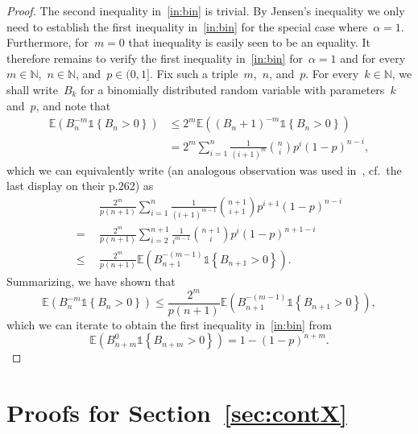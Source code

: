 \documentclass[11pt, a4paper]{article}
\newcommand{\N}{\mathbb{N}}
\theoremstyle{definition}
\begin{document}
\begin{proof}
The second inequality in~\eqref{in:bin} is trivial. By Jensen's inequality we only need to establish the first inequality in~\eqref{in:bin} for the special case where~$\alpha = 1$. Furthermore, for~$m = 0$ that inequality is easily seen to be an equality. It therefore remains to verify the first inequality in~\eqref{in:bin} for~$\alpha = 1$ and for every~$m \in \N$,~$n \in \N$, and~$p \in (0, 1]$. Fix such a triple~$m$,~$n$, and~$p$. For every~$k \in \N$, we shall write~$B_k$ for a binomially distributed random variable with parameters~$k$ and~$p$, and note that
%
\begin{equation*}
\begin{aligned}
\mathbb{E}\left(B_n^{-m} \mathds{1}\left\{B_n > 0\right\}\right) &\leq 2^m \mathbb{E}\left((B_n+1)^{-m} \mathds{1}\left\{B_n > 0\right\}\right) \\ &= 2^m \sum_{i = 1}^n \frac{1}{(i+1)^m} {n \choose i} p^i (1-p)^{n-i}, 
\end{aligned}
\end{equation*}
%
which we can equivalently write (an analogous observation was used in~\cite{rempala}, cf.~the last display on their p.262) as 
%
\begin{equation*}
\begin{aligned}
&\frac{2^m}{p(n+1)} \sum_{i = 1}^n \frac{1}{(i+1)^{m-1}} {n + 1  \choose i + 1} p^{i+1} (1-p)^{n-i} \\  = ~~ &\frac{2^m}{p(n+1)} \sum_{i = 2}^{n+1} \frac{1}{i^{m-1}} {n + 1  \choose i} p^{i} (1-p)^{n + 1 - i} \\
\leq ~~ &\frac{2^m}{p(n+1)} \mathbb{E}\left(B_{n+1}^{-(m-1)} \mathds{1}\left\{B_{n+1} > 0\right\}\right).
\end{aligned}
\end{equation*}
%
%
Summarizing, we have shown that
%
\begin{equation*}
\mathbb{E}\left(B_n^{-m} \mathds{1}\left\{B_n > 0\right\}\right) \leq \frac{2^m}{p(n+1)} \mathbb{E}\left(B_{n+1}^{-(m-1)} \mathds{1}\left\{B_{n+1} > 0\right\}\right),
\end{equation*}
%
which we can iterate to obtain the first inequality in~\eqref{in:bin} from 
\begin{equation*}
\mathbb{E}\left( B_{n+m}^0 \mathds{1}\left\{B_{n+m} > 0\right\} \right) = 1 - (1-p)^{n+m}.
\end{equation*}
\end{proof}
%

\section{Proofs for Section~\ref{sec:contX}}\label{app:contX}
\end{document}
